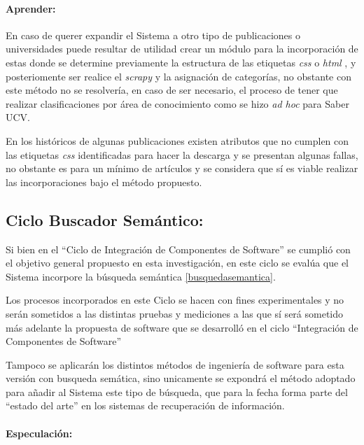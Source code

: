 \documentclass[
  12pt,
  openany]{book}
\begin{document}
\hypertarget{dcseisapre}{%
\paragraph{Aprender:}\label{dcseisapre}}

En caso de querer expandir el Sistema a otro tipo de publicaciones o universidades puede resultar de utilidad crear un módulo para la incorporación de estas donde se determine previamente la estructura de las etiquetas \emph{css} o \emph{html} , y posteriomente ser realice el \emph{scrapy} y la asignación de categorías, no obstante con este método no se resolvería, en caso de ser necesario, el proceso de tener que realizar clasificaciones por área de conocimiento como se hizo \emph{ad hoc} para Saber UCV.

En los históricos de algunas publicaciones existen atributos que no cumplen con las etiquetas \emph{css} identificadas para hacer la descarga y se presentan algunas fallas, no obstante es para un mínimo de artículos y se considera que sí es viable realizar las incorporaciones bajo el método propuesto.

\newpage

\hypertarget{desasarrollociclos5}{%
\subsection{Ciclo Buscador Semántico:}\label{desasarrollociclos5}}

Si bien en el ``Ciclo de Integración de Componentes de Software'' se cumplió con el objetivo general propuesto en esta investigación, en este ciclo se evalúa que el Sistema incorpore la búsqueda semántica \ref{busquedasemantica}.

Los procesos incorporados en este Ciclo se hacen con fines experimentales y no serán sometidos a las distintas pruebas y mediciones a las que sí será sometido más adelante la propuesta de software que se desarrolló en el ciclo ``Integración de Componentes de Software''

Tampoco se aplicarán los distintos métodos de ingeniería de software para esta versión con busqueda semática, sino unicamente se expondrá el método adoptado para añadir al Sistema este tipo de búsqueda, que para la fecha forma parte del ``estado del arte'' en los sistemas de recuperación de información.

\hypertarget{semanespe}{%
\paragraph{Especulación:}\label{semanespe}}
\end{document}
